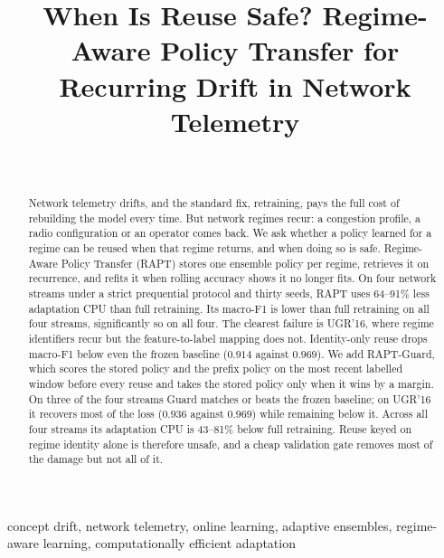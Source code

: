 \documentclass[conference]{IEEEtran}
\begin{document}
\title{When Is Reuse Safe? Regime-Aware Policy Transfer for Recurring Drift in Network Telemetry}


\author{\\
}


\maketitle


\begin{abstract}
Network telemetry drifts, and the standard fix, retraining, pays the full cost of
rebuilding the model every time. But network regimes recur: a congestion profile, a radio
configuration or an operator comes back. We ask whether a policy learned for a regime can
be reused when that regime returns, and when doing so is safe. Regime-Aware Policy
Transfer (RAPT) stores one ensemble policy per regime, retrieves it on recurrence, and
refits it when rolling accuracy shows it no longer fits. On four network streams under a
strict prequential protocol and thirty seeds, RAPT uses 64--91\% less adaptation CPU than
full retraining. Its macro-F1 is lower than full retraining on all four streams,
significantly so on all four. The clearest failure is UGR'16, where regime identifiers
recur but the feature-to-label mapping does not. Identity-only reuse drops macro-F1 below
even the frozen baseline ($0.914$ against $0.969$). We add RAPT-Guard, which scores the
stored policy and the prefix policy on the most recent labelled window before every reuse
and takes the stored policy only when it wins by a margin. On three of the four streams Guard matches or beats the frozen baseline; on UGR'16 it
recovers most of the loss ($0.936$ against $0.969$) while remaining below it. Across all
four streams its adaptation CPU is 43--81\% below full retraining. Reuse keyed on regime
identity alone is therefore unsafe, and a cheap validation gate removes most of the
damage but not all of it.
\end{abstract}


\begin{IEEEkeywords}
concept drift, network telemetry, online learning, adaptive ensembles, regime-aware
learning, computationally efficient adaptation
\end{IEEEkeywords}
\end{document}
